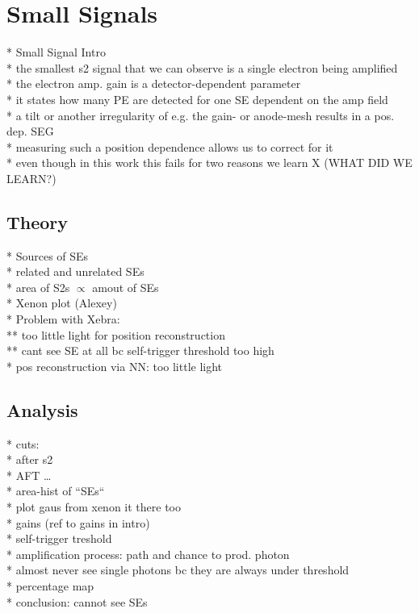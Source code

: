 
\section{Small Signals}
\label{sec:SmallSignals}


* Small Signal Intro \\
* the smallest s2 signal that we can observe is a single electron being amplified \\
* the electron amp. gain is a detector-dependent parameter \\
* it states how many PE are detected for one SE dependent on the amp field \\
* a tilt or another irregularity of e.g. the gain- or anode-mesh results in a pos. dep. SEG \\
* measuring such a position dependence allows us to correct for it \\
* even though in this work this fails for two reasons we learn X (WHAT DID WE LEARN?)


\subsection{Theory}

* Sources of SEs \\
* related and unrelated SEs \\
* area of S2s $\propto$ amout of SEs \\
* Xenon plot (Alexey) \\
* Problem with Xebra: \\
** too little light for position reconstruction \\
** cant see SE at all bc self-trigger threshold too high \\
* pos reconstruction via NN: too little light


\subsection{Analysis}

* cuts: \\
* after s2 \\
* AFT \dots \\
* area-hist of ``SEs`` \\
* plot gaus from xenon it there too \\
* gains (ref to gains in intro) \\
* self-trigger treshold \\
* amplification process: path and chance to prod. photon \\
* almost never see single photons bc they are always under threshold \\
* percentage map \\
* conclusion: cannot see SEs



